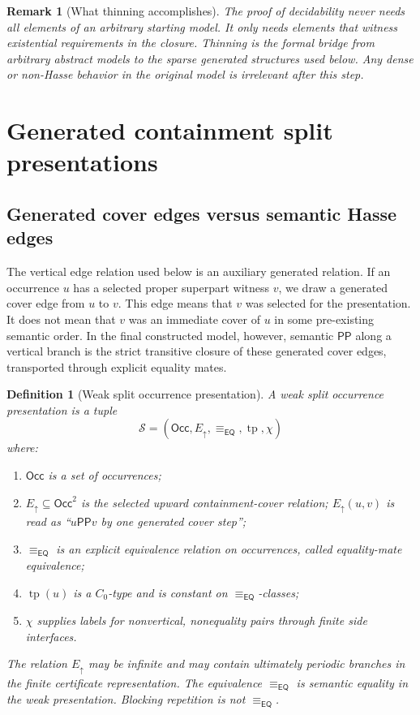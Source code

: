 \documentclass[11pt]{article}
\newtheorem{definition}[theorem]{Definition}
\newtheorem{remark}[theorem]{Remark}
\newcommand{\EQ}{\mathsf{EQ}}
\newcommand{\PP}{\mathsf{PP}}
\newcommand{\Occ}{\mathsf{Occ}}
\newcommand{\typ}{\operatorname{tp}}
\newcommand{\eqc}{\equiv_{\EQ}}
\begin{document}
\begin{remark}[What thinning accomplishes]
The proof of decidability never needs all elements of an arbitrary starting model.  It only needs elements that witness existential requirements in the closure.  Thinning is the formal bridge from arbitrary abstract models to the sparse generated structures used below.  Any dense or non-Hasse behavior in the original model is irrelevant after this step.
\end{remark}

\section{Generated containment split presentations}

\subsection{Generated cover edges versus semantic Hasse edges}

The vertical edge relation used below is an auxiliary generated relation.  If an occurrence $u$ has a selected proper superpart witness $v$, we draw a generated cover edge from $u$ to $v$.  This edge means that $v$ was selected for the presentation.  It does not mean that $v$ was an immediate cover of $u$ in some pre-existing semantic order.  In the final constructed model, however, semantic $\PP$ along a vertical branch is the strict transitive closure of these generated cover edges, transported through explicit equality mates.

\begin{definition}[Weak split occurrence presentation]\label{def:weak-presentation}
A weak split occurrence presentation is a tuple
\[
  \mathcal S=(\Occ,E_\uparrow,\eqc,\typ,\chi)
\]
where:
\begin{enumerate}[label=(S\arabic*)]
\item $\Occ$ is a set of occurrences;
\item $E_\uparrow\subseteq\Occ^2$ is the selected upward containment-cover relation; $E_\uparrow(u,v)$ is read as ``$u\PP v$ by one generated cover step'';
\item $\eqc$ is an explicit equivalence relation on occurrences, called equality-mate equivalence;
\item $\typ(u)$ is a $C_0$-type and is constant on $\eqc$-classes;
\item $\chi$ supplies labels for nonvertical, nonequality pairs through finite side interfaces.
\end{enumerate}
The relation $E_\uparrow$ may be infinite and may contain ultimately periodic branches in the finite certificate representation.  The equivalence $\eqc$ is semantic equality in the weak presentation.  Blocking repetition is not $\eqc$.
\end{definition}
\end{document}
